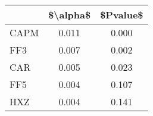 \begin{tabular}{lcc}
\toprule
{} &  \$\textbackslash alpha\$ &  \$Pvalue\$ \\
\midrule
CAPM &     0.011 &     0.000 \\
FF3  &     0.007 &     0.002 \\
CAR  &     0.005 &     0.023 \\
FF5  &     0.004 &     0.107 \\
HXZ  &     0.004 &     0.141 \\
\bottomrule
\end{tabular}
